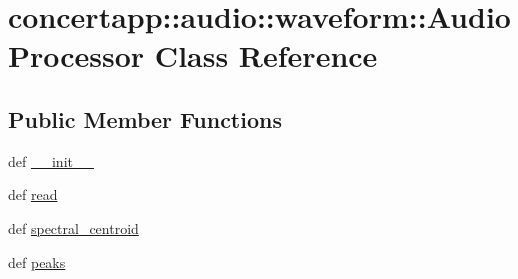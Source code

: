 \hypertarget{classconcertapp_1_1audio_1_1waveform_1_1_audio_processor}{
\section{concertapp::audio::waveform::AudioProcessor Class Reference}
\label{classconcertapp_1_1audio_1_1waveform_1_1_audio_processor}
}
\subsection*{Public Member Functions}
\begin{DoxyCompactItemize}
\item 
def \hyperlink{classconcertapp_1_1audio_1_1waveform_1_1_audio_processor_a74bf3933b571e0c356aad5b052b7064a}{\_\-\_\-init\_\-\_\-}
\item 
def \hyperlink{classconcertapp_1_1audio_1_1waveform_1_1_audio_processor_a29d629725942599295925fd5d863bafd}{read}
\item 
def \hyperlink{classconcertapp_1_1audio_1_1waveform_1_1_audio_processor_a8ce532ecbb0198f56eccea0a8d4cb51b}{spectral\_\-centroid}
\item 
def \hyperlink{classconcertapp_1_1audio_1_1waveform_1_1_audio_processor_a9fc1c019c015a55f8310fa189b4bf38b}{peaks}
\end{DoxyCompactItemize}
